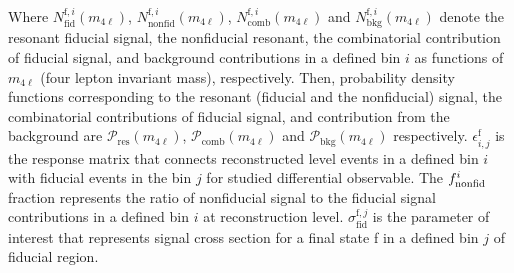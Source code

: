 Where  $N_{\mathrm{fid}}^{\mathrm{f},i}(m_{4\ell})$, $N_{\mathrm{nonfid}}^{\mathrm{f},i}(m_{4\ell})$, $N_{\mathrm{comb}}^{\mathrm{f},i}(m_{4\ell})$
and $N_{\mathrm{bkg}}^{\mathrm{f},i}(m_{4\ell})$ denote the resonant fiducial signal, the nonfiducial resonant, the combinatorial contribution of
fiducial signal, and background contributions in a defined bin $i$ as functions of $m_{4\ell}$ (four lepton invariant mass), respectively.
Then, probability density functions corresponding to the resonant (fiducial and the nonfiducial) signal, the combinatorial contributions of fiducial signal, and contribution from the background  are  $\mathcal{P}_{\mathrm{res}}(m_{4\ell})$, $\mathcal{P}_{\mathrm{comb}}(m_{4\ell})$ and $\mathcal{P}_{\mathrm{bkg}}(m_{4\ell})$  respectively.
 $\epsilon_{i,j}^{\mathrm{f}}$ is  the  response matrix that connects reconstructed level events in a defined bin $i$ with fiducial events in the bin $j$
for studied differential observable. The $f_{\rm nonfid}^{i}$ fraction represents the ratio of nonfiducial signal to the fiducial signal contributions 
in a defined bin $i$ at reconstruction level. $\sigma_{\mathrm{fid}}^{\mathrm{f},j}$ is the parameter of interest that represents signal cross section for a final
state f in a defined bin $j$ of fiducial region.

